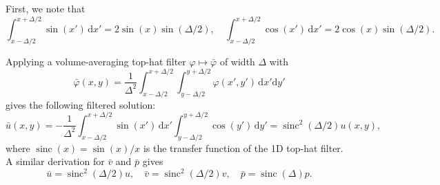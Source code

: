 \documentclass[preprint]{elsarticle}
\newcommand{\sinc}{\operatorname{sinc}}
\begin{document}
First, we note that
\begin{equation}
    \int_{x - \Delta / 2}^{x + \Delta / 2} \sin(x') \, \mathrm{d} x'
    = 2 \sin(x) \sin(\Delta / 2), \quad
    \int_{x - \Delta / 2}^{x + \Delta / 2} \cos(x') \, \mathrm{d} x'
    = 2 \cos(x) \sin(\Delta / 2).
\end{equation}

Applying a volume-averaging top-hat filter
$\varphi \mapsto \bar{\varphi}$
of width $\Delta$
with
\begin{equation}
    \bar{\varphi}(x, y) = \frac{1}{\Delta^2} \int_{x - \Delta/2}^{x + \Delta/2} \int_{y - \Delta/2}^{y + \Delta/2}
    \varphi(x', y') \, \mathrm{d} x' \mathrm{d} y'
\end{equation}
gives the following filtered solution:
\begin{equation}
    \bar{u}(x, y)
    = - \frac{1}{\Delta^2}
    \int_{x - \Delta/2}^{x + \Delta/2} \sin(x') \, \mathrm{d} x'
    \int_{y - \Delta/2}^{y + \Delta/2} \cos(y') \, \mathrm{d} y'
    = \sinc^2(\Delta / 2) u(x, y),
\end{equation}
where $\sinc(x) = \sin(x) / x$ is the transfer function of the 1D top-hat
filter. A similar derivation for $\bar{v}$ and $\bar{p}$ gives
\begin{equation}
    \bar{u} = \sinc^2(\Delta / 2) u, \quad
    \bar{v} = \sinc^2(\Delta / 2) v, \quad
    \bar{p} = \sinc(\Delta) p.
\end{equation}
\end{document}

